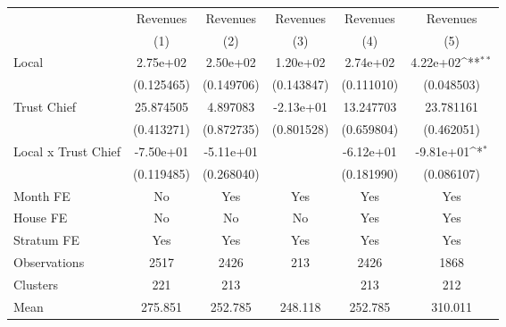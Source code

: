 {
\def\sym#1{\ifmmode^{#1}\else\(^{#1}\)\fi}
\begin{tabular}{l*{5}{c}}
\toprule
                &\multicolumn{1}{c}{Revenues}&\multicolumn{1}{c}{Revenues}&\multicolumn{1}{c}{Revenues}&\multicolumn{1}{c}{Revenues}&\multicolumn{1}{c}{Revenues}\\
                &\multicolumn{1}{c}{(1)}         &\multicolumn{1}{c}{(2)}         &\multicolumn{1}{c}{(3)}         &\multicolumn{1}{c}{(4)}         &\multicolumn{1}{c}{(5)}         \\
\midrule
Local           & 2.75e+02         & 2.50e+02         & 1.20e+02         & 2.74e+02         & 4.22e+02\sym{**} \\
                &(0.125465)         &(0.149706)         &(0.143847)         &(0.111010)         &(0.048503)         \\
Trust Chief     &25.874505         & 4.897083         &-2.13e+01         &13.247703         &23.781161         \\
                &(0.413271)         &(0.872735)         &(0.801528)         &(0.659804)         &(0.462051)         \\
Local x Trust Chief&-7.50e+01         &-5.11e+01         &                  &-6.12e+01         &-9.81e+01\sym{*}  \\
                &(0.119485)         &(0.268040)         &                  &(0.181990)         &(0.086107)         \\
Month FE        &       No         &      Yes         &      Yes         &      Yes         &      Yes         \\
House FE        &       No         &       No         &       No         &      Yes         &      Yes         \\
Stratum FE      &      Yes         &      Yes         &      Yes         &      Yes         &      Yes         \\
\midrule
Observations    &     2517         &     2426         &      213         &     2426         &     1868         \\
Clusters        &      221         &      213         &                  &      213         &      212         \\
Mean            &  275.851         &  252.785         &  248.118         &  252.785         &  310.011         \\
\bottomrule
\end{tabular}
}
